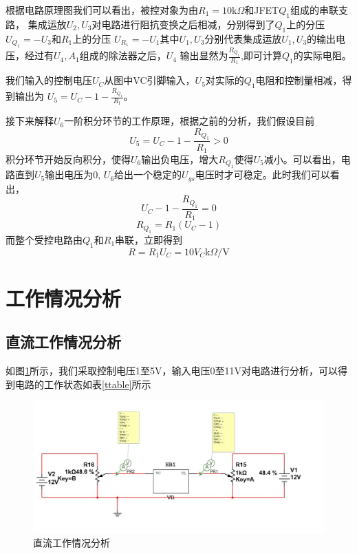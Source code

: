 \documentclass[UTF8,a4paper]{paper}
\begin{document}
根据电路原理图我们可以看出，被控对象为由$R_1=10\mathrm{k}\Omega$和JFET$Q_1$组成的串联支路，
集成运放$U_2,U_3$对电路进行阻抗变换之后相减，分别得到了$Q_1$上的分压$U_{Q_1}=-U_3$和$R_1$上的分压
$U_{R_1}=-U_1$其中$U_1,U_3$分别代表集成运放$U_1,U_3$的输出电压，经过有$U_4,A_1$组成的除法器之后，$U_4$
输出显然为$\frac{R_{Q_1}}{R_1}$,即可计算$Q_1$的实际电阻。

我们输入的控制电压$U_C$从图中VC引脚输入，$U_5$对实际的$Q_1$电阻和控制量相减，得到输出为
$U_5=U_C-1-\frac{R_{Q_1}}{R_1}$。

接下来解释$U_6$一阶积分环节的工作原理，根据之前的分析，我们假设目前$$U_5=U_C-1-\frac{R_{Q_1}}{R_1}>0$$
积分环节开始反向积分，使得$U_6$输出负电压，增大$R_{Q_1}$使得$U_5$减小。可以看出，电路直到$U_5$输出电压为0,
$U_6$给出一个稳定的$U_{gs}$电压时才可稳定。此时我们可以看出，$$U_C-1-\frac{R_{Q_1}}{R_1}=0$$ $$R_{Q_1}
=R_1(U_C-1)$$而整个受控电路由$Q_1$和$R_1$串联，立即得到$$R=R_1U_C=10V_C\mathrm{k}\Omega/\mathrm{V}$$

\section{工作情况分析}
\subsection{直流工作情况分析}
如图\ref{2}所示，我们采取控制电压1至5V，输入电压0至11V对电路进行分析，可以得到电路的工作状态如表\ref{ttable}所示

\begin{figure}
\centering
\includegraphics[width=\textwidth]{2.jpg}
\caption{直流工作情况分析}
\label{2}
\end{figure}
\end{document}
